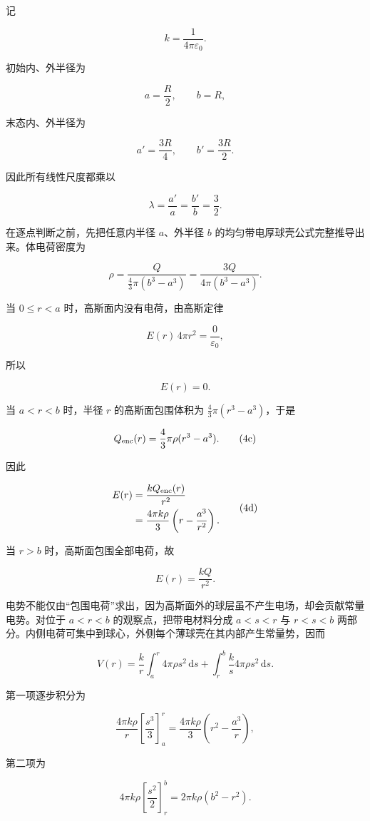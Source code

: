 \documentclass[12pt,a4paper,UTF8]{ctexart}
\begin{document}
记

\[
k=\frac{1}{4\pi\varepsilon_0}.
\tag{1}
\]

初始内、外半径为

\[
a=\frac R2,
\qquad
b=R,
\tag{2}
\]

末态内、外半径为

\[
a'=\frac{3R}{4},
\qquad
b'=\frac{3R}{2}.
\tag{3}
\]

因此所有线性尺度都乘以

\[
\lambda=\frac{a'}a=\frac{b'}b=\frac32.
\tag{4}
\]

在逐点判断之前，先把任意内半径 \(a\)、外半径 \(b\)
的均匀带电厚球壳公式完整推导出来。体电荷密度为

\[
\rho=\frac{Q}{\frac43\pi(b^3-a^3)}
=\frac{3Q}{4\pi(b^3-a^3)}.
\tag{4a}
\]

当 \(0\le r<a\) 时，高斯面内没有电荷，由高斯定律

\[
E(r)\,4\pi r^2=\frac{0}{\varepsilon_0},
\]

所以

\[
E(r)=0.
\tag{4b}
\]

当 \(a<r<b\) 时，半径 \(r\) 的高斯面包围体积为
\(\frac43\pi(r^3-a^3)\)，于是

\[
Q_{\rm enc}(r)
=\frac43\pi\rho(r^3-a^3).
\tag{4c}
\]

因此

\[
\begin{aligned}
E(r)
&=\frac{kQ_{\rm enc}(r)}{r^2}\\
&=\frac{4\pi k\rho}{3}
\left(r-\frac{a^3}{r^2}\right).
\end{aligned}
\tag{4d}
\]

当 \(r>b\) 时，高斯面包围全部电荷，故

\[
E(r)=\frac{kQ}{r^2}.
\tag{4e}
\]

电势不能仅由``包围电荷''求出，因为高斯面外的球层虽不产生电场，却会贡献常量电势。对位于
\(a<r<b\) 的观察点，把带电材料分成 \(a<s<r\) 与 \(r<s<b\)
两部分。内侧电荷可集中到球心，外侧每个薄球壳在其内部产生常量势，因而

\[
V(r)
=\frac{k}{r}\int_a^r4\pi\rho s^2\,\mathrm ds
+\int_r^b\frac{k}{s}4\pi\rho s^2\,\mathrm ds.
\tag{4f}
\]

第一项逐步积分为

\[
\frac{4\pi k\rho}{r}
\left[\frac{s^3}{3}\right]_a^r
=\frac{4\pi k\rho}{3}
\left(r^2-\frac{a^3}{r}\right),
\tag{4g}
\]

第二项为

\[
4\pi k\rho\left[\frac{s^2}{2}\right]_r^b
=2\pi k\rho(b^2-r^2).
\tag{4h}
\]
\end{document}
